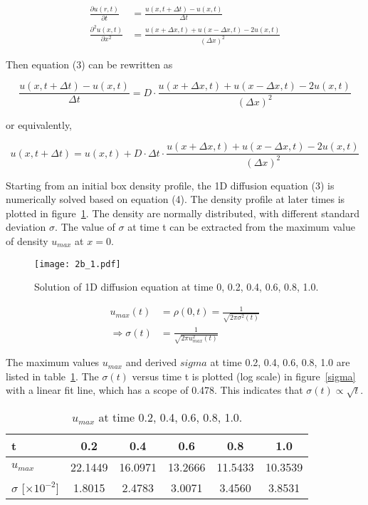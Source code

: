 \documentclass{article}
\begin{document}
\begin{align*}
\frac{\partial u (r,t)}{\partial t} & = \frac{u(x,t+\Delta t) - u(x,t)}{\Delta t} \\
\frac{\partial^2 u(x,t)}{\partial x^2} & = \frac{u(x+\Delta x,t)+u(x-\Delta x,t)-2u(x,t)}{(\Delta x)^2}
\end{align*}

Then equation (3) can be rewritten as

\begin{equation*}
\frac{u(x,t+\Delta t) - u(x,t)}{\Delta t} = D \cdot \frac{u(x+\Delta x,t)+u(x-\Delta x,t)-2u(x,t)}{(\Delta x)^2}
\end{equation*}

or equivalently,

\begin{equation}
u(x,t+\Delta t) = u(x,t) + D \cdot \Delta t \cdot \frac{u(x+\Delta x,t)+u(x-\Delta x,t)-2u(x,t)}{(\Delta x)^2}
\end{equation}

Starting from an initial box density profile, the 1D diffusion equation (3) is numerically solved based on equation (4). The density profile at later times is plotted in figure~\ref{diffusion}. The density are normally distributed, with different standard deviation $\sigma$. The value of $\sigma$ at time t can be extracted from the maximum value of density $u_{max}$ at $x=0$.

\begin{figure}
\centering
\texttt{[image: 2b\_1.pdf]}
\caption{Solution of 1D diffusion equation at time 0, 0.2, 0.4, 0.6, 0.8, 1.0.}
\label{diffusion}
\end{figure}

\begin{align*}
u_{max} (t) & = \rho(0,t) = \frac{1}{\sqrt{2\pi \sigma^2 (t)}} \\
\Rightarrow \sigma(t) & = \frac{1}{\sqrt{2\pi u_{max}^2 (t)}}
\end{align*}

The maximum values $u_{max}$ and derived $sigma$ at time 0.2, 0.4, 0.6, 0.8, 1.0 are listed in table~\ref{umax}. The $\sigma (t)$ versus time t is plotted (log scale) in figure~\ref{sigma} with a linear fit line, which has a scope of 0.478. This indicates that $\sigma(t) \propto \sqrt{t}$.

\begin{table}[!ht]
\begin{center}
\caption{$u_{max}$ at time 0.2, 0.4, 0.6, 0.8, 1.0.}
\begin{tabular}{ l | c | c | c | c | c }
\hline
t & 0.2 & 0.4 & 0.6 & 0.8 & 1.0 \\ \hline
$u_{max}$ & 22.1449 & 16.0971 & 13.2666 & 11.5433 & 10.3539 \\ \hline
$\sigma$ [$\times 10^{-2}$] & 1.8015 & 2.4783 & 3.0071 & 3.4560 & 3.8531 \\ \hline
\end{tabular}
\end{center}
\label{umax}
\end{table}
\end{document}
